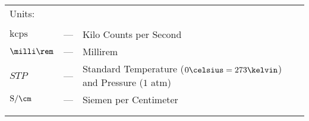 \begin{longtable}{p{25mm} c p{120mm} }
\multicolumn{3}{l}{Units:}\\
\\
$\text{kcps}$ & --- & Kilo Counts per Second\\
$\milli\rem$ & --- & Millirem\\
$STP$ & --- & Standard Temperature ($0\celsius=273\kelvin$) and 
\newline
Pressure ($1$ atm)\\
$\text{S}/\cm$ & --- & Siemen per Centimeter\\
\\
\\
\end{longtable}
